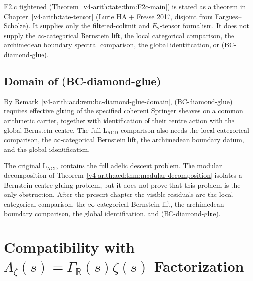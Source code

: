 \begin{remark}
\label{v4-arith:lacd:rem:F2c-closed}
F2.c tightened (Theorem~\ref{v4-arith:tate:thm:F2c-main}) is stated as
a \ClaimStatusProvedHere theorem in Chapter~\ref{v4-arith:tate-tensor}
(Lurie HA + Fresse 2017, disjoint from Fargues--Scholze). It supplies
only the filtered-colimit and \(E_{2}\)-tensor formalism. It does not
supply the \(\infty\)-categorical Bernstein lift, the local categorical
comparison, the archimedean boundary spectral comparison, the global
identification, or (BC-diamond-glue).
\end{remark}

\subsection{Domain of (BC-diamond-glue)}

\begin{remark}
\label{v4-arith:lacd:rem:BC-diamond-glue-domain}
By Remark~\ref{v4-arith:acd:rem:bc-diamond-glue-domain}, (BC-diamond-glue)
requires effective gluing of the specified coherent Springer
sheaves on a common arithmetic carrier, together with identification
of their centre action with the global Bernstein centre.
The full \(\mathrm{L}_{\mathrm{ACD}}\) comparison also needs the local
categorical comparison, the \(\infty\)-categorical Bernstein lift, the
archimedean boundary datum, and the global identification.
\end{remark}

\begin{remark}
\label{v4-arith:lacd:rem:cumulative-reduction}
The original \(\mathrm{L}_{\mathrm{ACD}}\) contains the full adelic
descent problem. The modular decomposition of
Theorem~\ref{v4-arith:acd:thm:modular-decomposition} isolates a
Bernstein-centre gluing problem, but it does not
prove that this problem is the only obstruction. After the present
chapter the visible residuals are the local categorical comparison,
the \(\infty\)-categorical Bernstein lift, the archimedean boundary
comparison, the global identification, and (BC-diamond-glue).
\end{remark}

\section{Compatibility with \(\Lambda_{\zeta}(s) = \Gamma_{\mathbb{R}}(s)\zeta(s)\) Factorization}
\label{v4-arith:lacd:xi-compat}

